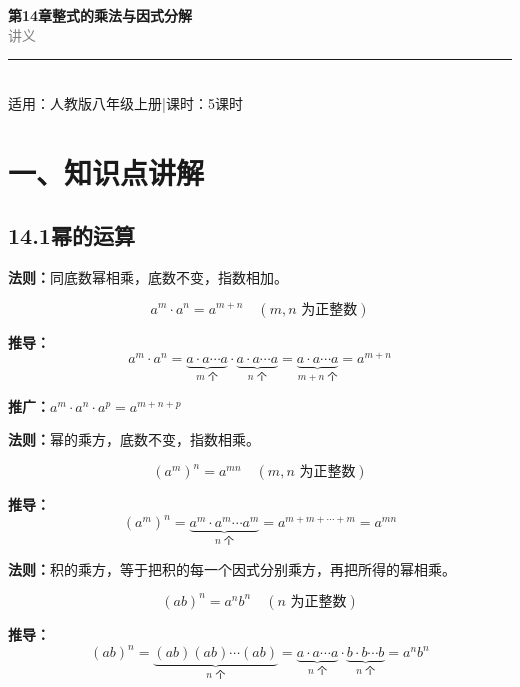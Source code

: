 \documentclass[12pt, a4paper]{ctexart}
\begin{document}
\begin{center}
{\Huge\bfseries\textcolor{mainblue}{第14章\quad 整式的乘法与因式分解}}\\[12pt]
{\Large\textcolor{gray}{讲\quad 义}}\\[8pt]
\rule{0.6\textwidth}{1pt}\\[8pt]
{\normalsize 适用：人教版\quad 八年级上册\quad |\quad 课时：5课时}
\end{center}
\vspace{10pt}

\section*{\textcolor{mainblue}{一、知识点讲解}}

\subsection*{14.1\quad 幂的运算}

\begin{knowledgebox}[同底数幂相乘]
\textbf{法则：}同底数幂相乘，底数不变，指数相加。

$$\boxed{a^m \cdot a^n = a^{m+n}} \quad (m, n \text{ 为正整数})$$

\textbf{推导：}
$$a^m \cdot a^n = \underbrace{a \cdot a \cdots a}_{m \text{ 个}} \cdot \underbrace{a \cdot a \cdots a}_{n \text{ 个}} = \underbrace{a \cdot a \cdots a}_{m+n \text{ 个}} = a^{m+n}$$

\textbf{推广：}$a^m \cdot a^n \cdot a^p = a^{m+n+p}$
\end{knowledgebox}

\begin{knowledgebox}[幂的乘方]
\textbf{法则：}幂的乘方，底数不变，指数相乘。

$$\boxed{(a^m)^n = a^{mn}} \quad (m, n \text{ 为正整数})$$

\textbf{推导：}
$$(a^m)^n = \underbrace{a^m \cdot a^m \cdots a^m}_{n \text{ 个}} = a^{m+m+\cdots+m} = a^{mn}$$
\end{knowledgebox}

\begin{knowledgebox}[积的乘方]
\textbf{法则：}积的乘方，等于把积的每一个因式分别乘方，再把所得的幂相乘。

$$\boxed{(ab)^n = a^n b^n} \quad (n \text{ 为正整数})$$

\textbf{推导：}
$$(ab)^n = \underbrace{(ab)(ab)\cdots(ab)}_{n \text{ 个}} = \underbrace{a \cdot a \cdots a}_{n \text{ 个}} \cdot \underbrace{b \cdot b \cdots b}_{n \text{ 个}} = a^n b^n$$
\end{knowledgebox}
\end{document}
